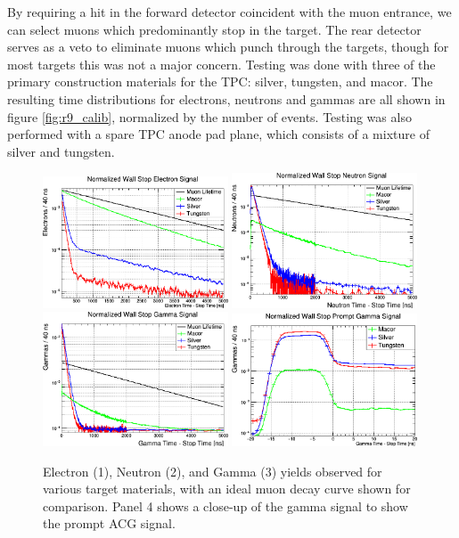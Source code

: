 By requiring a hit in the forward detector coincident with the muon entrance, we can select muons which predominantly stop in the target.
The rear detector serves as a veto to eliminate muons which punch through the targets, though for most targets this was not a major concern.
Testing was done with three of the primary construction materials for the TPC: silver, tungsten, and macor.
The resulting time distributions for electrons, neutrons and gammas are all shown in figure \ref{fig:r9_calib}, normalized by the number of events.
Testing was also performed with a spare TPC anode pad plane, which consists of a mixture of silver and tungsten.

\begin{figure}[h]
  \includegraphics[width=0.49\textwidth]{neutrons/figures/R9Calib_Electron.png}
  \includegraphics[width=0.49\textwidth]{neutrons/figures/R9Calib_Neutron.png} \\
  \includegraphics[width=0.49\textwidth]{neutrons/figures/R9Calib_Gamma.png}
  \includegraphics[width=0.49\textwidth]{neutrons/figures/R9Calib_Gamma2.png}
  \caption{Electron (1), Neutron (2), and Gamma (3) yields observed for various target materials, with an ideal muon decay curve shown for comparison.  Panel 4 shows a close-up of the gamma signal to show the prompt ACG signal.}
  \label{fig:r9calib}
\end{figure}


